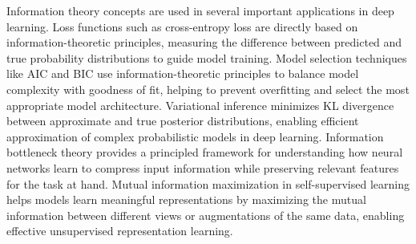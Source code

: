 Information theory concepts are used in several important applications in deep learning. Loss functions such as cross-entropy loss are directly based on information-theoretic principles, measuring the difference between predicted and true probability distributions to guide model training. Model selection techniques like AIC and BIC use information-theoretic principles to balance model complexity with goodness of fit, helping to prevent overfitting and select the most appropriate model architecture. Variational inference minimizes KL divergence between approximate and true posterior distributions, enabling efficient approximation of complex probabilistic models in deep learning. Information bottleneck theory provides a principled framework for understanding how neural networks learn to compress input information while preserving relevant features for the task at hand. Mutual information maximization in self-supervised learning helps models learn meaningful representations by maximizing the mutual information between different views or augmentations of the same data, enabling effective unsupervised representation learning.
